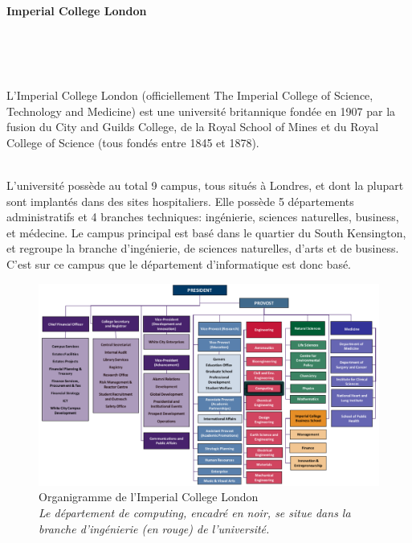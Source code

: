 \documentclass[10pt]{report}
\begin{document}
	\paragraph{Imperial College London}~\par ~\par %
	L’Imperial College London (officiellement The Imperial College of Science, Technology and Medicine) est une université britannique fondée en 1907 par la fusion du City and Guilds College, de la Royal School of Mines et du Royal College of Science (tous fondés entre 1845 et 1878).\\ ~\par
    L'université possède au total 9 campus, tous situés à Londres, et dont la plupart sont implantés dans des sites hospitaliers.  
    Elle possède 5 départements administratifs et 4 branches techniques: ingénierie, sciences naturelles, business, et médecine.	Le campus principal est basé dans le quartier du South Kensington, et regroupe la branche d'ingénierie, de sciences naturelles, d'arts et de business. C'est sur ce campus que le département d'informatique est donc basé. 
	\begin{figure}[h!]
		\begin{center}
			\includegraphics[width=18cm]{Reports/figures/College-Organisation.pdf}
		\end{center}
		\caption{Organigramme de l'Imperial College London \\ \textit{Le département de computing, encadré en noir, se situe dans la branche d'ingénierie (en rouge) de l'université.}}
		\label{Organigramme de l'Imperial College London}
	\end{figure}
	


	
\end{document}
